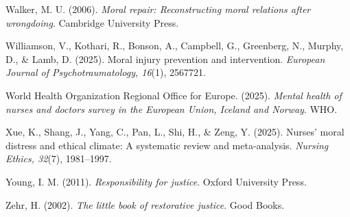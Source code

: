 \documentclass[
  11pt,
]{article}
\begin{document}
Walker, M. U. (2006). \emph{Moral repair: Reconstructing moral relations
after wrongdoing}. Cambridge University Press.

Williamson, V., Kothari, R., Bonson, A., Campbell, G., Greenberg, N.,
Murphy, D., \& Lamb, D. (2025). Moral injury prevention and
intervention. \emph{European Journal of Psychotraumatology, 16}(1),
2567721.

World Health Organization Regional Office for Europe. (2025).
\emph{Mental health of nurses and doctors survey in the European Union,
Iceland and Norway}. WHO.

Xue, K., Shang, J., Yang, C., Pan, L., Shi, H., \& Zeng, Y. (2025).
Nurses' moral distress and ethical climate: A systematic review and
meta-analysis. \emph{Nursing Ethics, 32}(7), 1981--1997.

Young, I. M. (2011). \emph{Responsibility for justice}. Oxford
University Press.

Zehr, H. (2002). \emph{The little book of restorative justice}. Good
Books.
\end{document}
